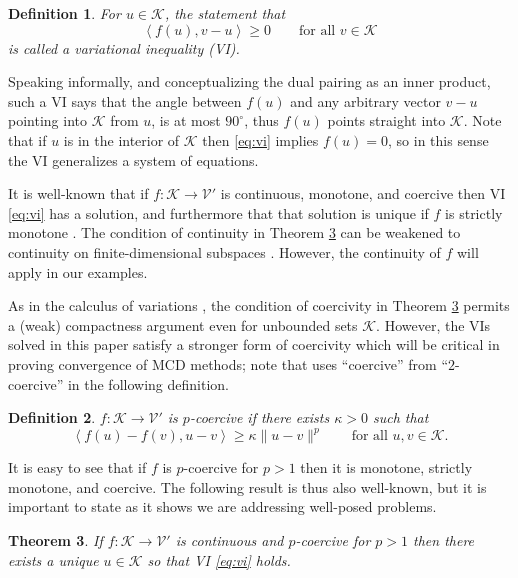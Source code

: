 \documentclass[letterpaper,final,12pt,reqno]{amsart}
\theoremstyle{cstyle}
\newtheorem{theorem}{Theorem}
\theoremstyle{dstyle}
\newtheorem{definition}[theorem]{Definition}
\numberwithin{equation}{section}
\numberwithin{figure}{section}
\numberwithin{table}{section}
\numberwithin{theorem}{section}
\newcommand{\cK}{\mathcal{K}}
\newcommand{\cV}{\mathcal{V}}
\newcommand{\ip}[2]{\left<#1,#2\right>}
\begin{document}
\begin{definition} For $u\in \cK$, the statement that
\begin{equation}
\ip{f(u)}{v-u} \ge 0 \qquad \text{for all } v\in \cK \label{eq:vi}
\end{equation}
is called a \emph{variational inequality} (VI).
\end{definition}


Speaking informally, and conceptualizing the dual pairing as an inner product, such a VI says that the angle between $f(u)$ and any arbitrary vector $v-u$ pointing into $\cK$ from $u$, is at most $90^\circ$, thus $f(u)$ points straight into $\cK$.  Note that if $u$ is in the interior of $\cK$ then \eqref{eq:vi} implies $f(u)=0$, so in this sense the VI generalizes a system of equations.

It is well-known that if $f:\cK \to \cV'$ is continuous, monotone, and coercive then VI \eqref{eq:vi} has a solution, and furthermore that that solution is unique if $f$ is strictly monotone \cite[Corollary III.1.8]{KinderlehrerStampacchia1980}.  The condition of continuity in Theorem \ref{thm:viwellposed} can be weakened to continuity on finite-dimensional subspaces \cite{KinderlehrerStampacchia1980}.  However, the continuity of $f$ will apply in our examples.

As in the calculus of variations \cite{Evans2010}, the condition of coercivity in Theorem \ref{thm:viwellposed} permits a (weak) compactness argument even for unbounded sets $\cK$.   However, the VIs solved in this paper satisfy a stronger form of coercivity which will be critical in proving convergence of MCD methods; note that \cite{Tai2003} uses ``coercive'' from ``$2$-coercive'' in the following definition.

\begin{definition}  $f:\cK \to \cV'$ is \emph{$p$-coercive} if there exists $\kappa>0$ such that
\begin{equation}
\ip{f(u)-f(v)}{u-v} \ge \kappa \|u-v\|^p \qquad \text{for all } u,v \in \cK. \label{eq:pcoercive}
\end{equation}
\end{definition}

It is easy to see that if $f$ is $p$-coercive for $p>1$ then it is monotone, strictly monotone, and coercive.  The following result is thus also well-known, but it is important to state as it shows we are addressing well-posed problems.

\begin{theorem}  \label{thm:viwellposed}  If $f:\cK \to \cV'$ is continuous and $p$-coercive for $p>1$ then there exists a unique $u\in \cK$ so that VI \eqref{eq:vi} holds.
\end{theorem}
\end{document}
